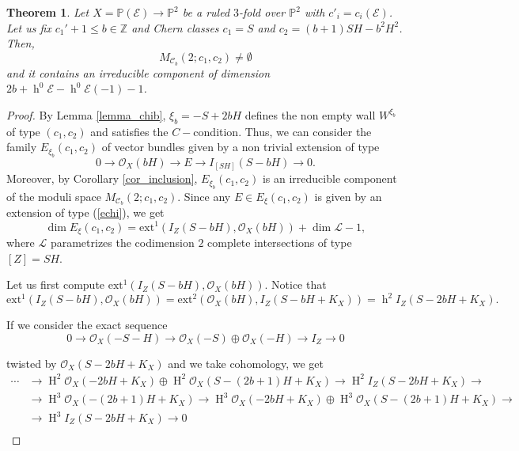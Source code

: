 \documentclass[11pt,twoside]{amsart}
\newtheorem{theorem}{Theorem}[section]
\theoremstyle{definition}
\newcommand {\ext}{\mathrm{ext}}
\newcommand{\h}{\operatorname{h}}
\newcommand{\Ho}{\operatorname{H}}
\begin{document}
 \begin{theorem}\label{th_irreducible_comp}Let $X=\mathbb{P}(\mathcal{E})\rightarrow\mathbb{P}^2$ be a ruled  $3$-fold  over $\mathbb{P}^2$ with $c'_i=c_i(\mathcal{E})$.  Let us fix $c_1'+1\leq b\in\mathbb{Z}$ and Chern classes $c_1=S$ and $c_2=(b+1)SH-b^2H^2$. %
 Then,  $$M_{\mathcal{C}_b}(2;c_1,c_2)\neq\emptyset$$ and it contains an irreducible component of dimension $2b+\h^0\mathcal{E}-\h^0\mathcal{E}(-1)-1$.
        \end{theorem}     
        \begin{proof}
        By Lemma \ref{lemma_chib}, $\xi_b=-S+2bH$ defines the non empty wall $W^{\xi_b}$ of type $(c_1,c_2)$ and satisfies the $C-$condition. Thus, we can consider the family $E_{\xi_b}(c_1,c_2)$ of vector bundles given by a non trivial extension of type 
        \begin{equation}
        \label{echi}
         0\rightarrow\mathcal{O}_X(bH)\rightarrow E\rightarrow I_{[SH]}(S-bH)\rightarrow0.   
        \end{equation} Moreover, by Corollary \ref{cor_inclusion}, $E_{\xi_b}(c_1,c_2)$ is an irreducible component of the moduli space $M_{\mathcal{C}_b}(2;c_1,c_2)$. Since any $E\in E_{\xi}(c_1,c_2)$ is given by an extension of type (\ref{echi}), we get $$\dim{E_{\xi}}(c_1,c_2)=\ext^1 (I_Z(S-bH),\mathcal{O}_X(bH))+\dim\mathcal{L}-1,$$ where $\mathcal{L}$ parametrizes the codimension $2$ complete intersections of type $[Z]=SH$. 

Let us first compute $\ext^1 (I_{Z}(S-bH),\mathcal{O}_X(bH))$. Notice that $$\ext^1 (I_{Z}(S-bH),\mathcal{O}_X(bH))=\ext^2(\mathcal{O}_X(bH), I_Z(S-bH+K_X))=\h^2I_Z(S-2bH+K_X).$$

If we consider the exact sequence 
\begin{equation}
\label{eq_SH}
  0\rightarrow\mathcal{O}_X(-S-H)\rightarrow\mathcal{O}_X(-S)\oplus\mathcal{O}_X(-H)\rightarrow I_Z\rightarrow0  
\end{equation}

 twisted by $\mathcal{O}_X(S-2bH+K_X)$ and we take cohomology, we get 
\begin{equation}
\begin{array}{ll}
\label{suc_coh2}
\cdots &\rightarrow \Ho^2\mathcal{O}_X(-2bH+K_X) \oplus \Ho^2\mathcal{O}_X(S-(2b+1)H+K_X) \rightarrow \Ho^2I_Z(S-2bH+K_X) \rightarrow \\
&\rightarrow \Ho^{3}\mathcal{O}_X(-(2b+1)H+K_X) \rightarrow \Ho^{3}\mathcal{O}_X(-2bH+K_X) \oplus \Ho^{3}\mathcal{O}_X(S-(2b+1)H+K_X) \rightarrow \\
&\rightarrow \Ho^3I_Z(S-2bH+K_X) \rightarrow 0\\
\end{array}
\end{equation}




\end{proof}
\end{document}
